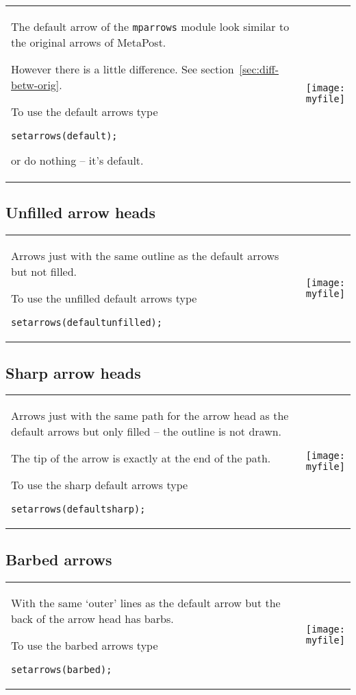 \documentclass[paper=a4,11pt,UKenglish,DIV=calc,BCOR=0mm,parskip=half,fleqn]{scrartcl}
\makeatletter
\newenvironment{example}[1]{%
  \def\myfile{#1}
  \begin{tabular}{@{}p{.67\linewidth-\tabcolsep}p{.33\linewidth}@{}}
    \begin{minipage}[c]{\linewidth}}{%
    \end{minipage}
    &\parbox[c]{\linewidth}{\centering\texttt{[image: \\myfile]}}
  \end{tabular}}
\makeatother
\begin{document}
\begin{example}{mparrowsexamples1.mps}
  The default arrow of the \texttt{mparrows} module look similar to the
  original arrows of MetaPost.

  However there is a little difference. See
  section~\vref{sec:diff-betw-orig}.

  To use the default arrows type
\begin{lstlisting}
setarrows(default);
\end{lstlisting}
  or do nothing -- it's default.
\end{example}

\subsection{Unfilled arrow heads}
\label{sec:unfilled-arrow-heads}

\begin{example}{mparrowsexamples2.mps}
  Arrows just with the same outline as the default arrows but not
  filled.

  To use the unfilled default arrows type
\begin{lstlisting}
setarrows(defaultunfilled);
\end{lstlisting}
\end{example}

\subsection{Sharp arrow heads}
\label{sec:sharp-arrow-heads}

\begin{example}{mparrowsexamples3.mps}
  Arrows just with the same path for the arrow head as the default
  arrows but only filled -- the outline is not drawn.

  The tip of the arrow is exactly at the end of the path.

  To use the sharp default arrows type
\begin{lstlisting}
setarrows(defaultsharp);
\end{lstlisting}
\end{example}

\subsection{Barbed arrows}
\label{sec:barbed-arrows-1}


\begin{example}{mparrowsexamples4.mps}
  With the same `outer' lines as the default arrow but the back of the
  arrow head has barbs.

  To use the barbed arrows type
\begin{lstlisting}
setarrows(barbed);
\end{lstlisting}
\end{example}
\end{document}
